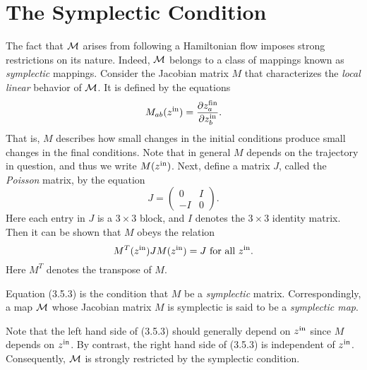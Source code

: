\section{The Symplectic Condition}
\label{symplectic}
     The fact that ${\cal M}$ arises from following a Hamiltonian flow imposes
strong restrictions on its nature.  Indeed, ${\cal M}$ belongs to a class of
mappings known as {\em symplectic} mappings.  Consider the Jacobian matrix $M$ that
characterizes the {\em local linear} behavior of ${\cal M}$.  It is defined by the
equations
\begin{equation}
          M_{ab}(z^{\mbox{\scriptsize in}}) = \frac{\partial z_a^{\mbox{\scriptsize fin}}}{\partial z_b^{\mbox{\scriptsize in}}}.
\end{equation}
That is, $M$ describes how small changes in the initial conditions produce
small changes in the final conditions.  Note that in general $M$ depends on
the trajectory in question, and thus we write $M(z^{\mbox{\scriptsize in}})$.  Next, define a matrix $J$, called the {\em Poisson} matrix, by the equation
\begin{equation}
           J = \left( \begin{array}{cc}
                      0 & I\\
                      -I & 0
                      \end{array}
               \right).
\end{equation}
Here each entry in $J$ is a $3 \times 3$ block, and $I$ denotes the $3 \times 3$ identity
matrix.  Then it can be shown that $M$ obeys the relation
\begin{equation}
       M^T(z^{\mbox{\scriptsize in}}) J M(z^{\mbox{\scriptsize in}}) = J \mbox{ for all }z^{\mbox{\scriptsize in}}.
\end{equation}
Here $M^T$ denotes the transpose of $M $.

     Equation (3.5.3) is the condition that $M$ be a {\em symplectic} matrix.
Correspondingly, a map ${\cal M}$ whose Jacobian matrix $M$ is symplectic is said to
be a {\em symplectic map}.

     Note that the left hand side of (3.5.3) should generally depend on $z^{\mbox{\scriptsize in}}$
since $M$ depends on $z^{\mbox{\scriptsize in}}$.  By contrast, the right hand side of (3.5.3) is independent of $z^{\mbox{\scriptsize in}}$.  Consequently, ${\cal M}$ is strongly restricted by the symplectic condition.

